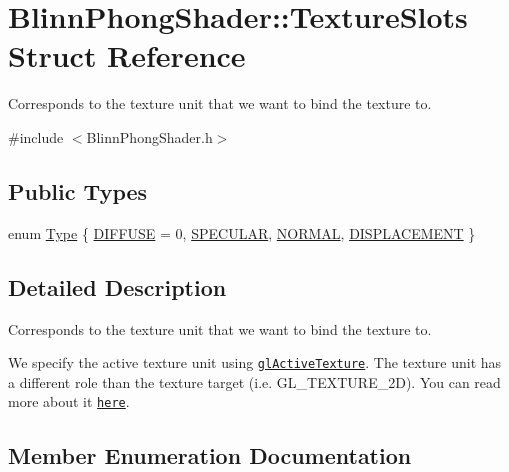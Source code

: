 \hypertarget{struct_blinn_phong_shader_1_1_texture_slots}{}\section{Blinn\+Phong\+Shader\+:\+:Texture\+Slots Struct Reference}
\label{struct_blinn_phong_shader_1_1_texture_slots}


Corresponds to the texture unit that we want to bind the texture to.




{\ttfamily \#include $<$Blinn\+Phong\+Shader.\+h$>$}

\subsection*{Public Types}
\begin{DoxyCompactItemize}
\item
enum \hyperlink{struct_blinn_phong_shader_1_1_texture_slots_a98940b49ba855ee47d61a6243c05c34d}{Type} \{ \hyperlink{struct_blinn_phong_shader_1_1_texture_slots_a98940b49ba855ee47d61a6243c05c34da186e353d3c15d10c2020688e6d19f848}{D\+I\+F\+F\+U\+SE} = 0,
\hyperlink{struct_blinn_phong_shader_1_1_texture_slots_a98940b49ba855ee47d61a6243c05c34daecb7e8082bc31bc5bb4318591411eb70}{S\+P\+E\+C\+U\+L\+AR},
\hyperlink{struct_blinn_phong_shader_1_1_texture_slots_a98940b49ba855ee47d61a6243c05c34da9c8fe4cf162e05245c9be7b4c28cf227}{N\+O\+R\+M\+AL},
\hyperlink{struct_blinn_phong_shader_1_1_texture_slots_a98940b49ba855ee47d61a6243c05c34da7cacdf320db9a183b63d7d76dba8a4f6}{D\+I\+S\+P\+L\+A\+C\+E\+M\+E\+NT}
 \}
\end{DoxyCompactItemize}


\subsection{Detailed Description}
Corresponds to the texture unit that we want to bind the texture to.

We specify the active texture unit using \href{https://www.opengl.org/sdk/docs/man/html/glActiveTexture.xhtml}{\tt gl\+Active\+Texture}. The texture unit has a different role than the texture target (i.\+e. G\+L\+\_\+\+T\+E\+X\+T\+U\+R\+E\+\_\+2D). You can read more about it \href{https://www.opengl.org/wiki/Texture}{\tt here}.

\subsection{Member Enumeration Documentation}
\hypertarget{struct_blinn_phong_shader_1_1_texture_slots_a98940b49ba855ee47d61a6243c05c34d}{}\label{struct_blinn_phong_shader_1_1_texture_slots_a98940b49ba855ee47d61a6243c05c34d}
